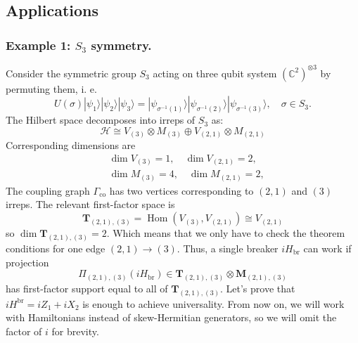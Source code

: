 \documentclass[10pt,twocolumn,superscriptaddress,aps,amsmath,amssymb,citeautoscript,floatfix,prx]{revtex4-2}
\theoremstyle{plain}
\theoremstyle{plain}
\theoremstyle{plain}
\theoremstyle{plain}
\theoremstyle{plain}
\theoremstyle{plain}
\newcommand{\HH}{\mathcal{H}}
\theoremstyle{plain}
\theoremstyle{definition}
\theoremstyle{plain}
\begin{document}
\begin{appendix}
\subsection{Applications}\label{sec:H_br_applications}
\label{sec:applications}

\subsubsection*{Example 1: $S_3$ symmetry.}

Consider the symmetric group $S_3$ acting on three qubit system $(\mathbb{C}^2)^{\otimes 3}$ by permuting them, i. e.
\[
U(\sigma)|\psi_1\rangle|\psi_2\rangle|\psi_3\rangle=|\psi_{\sigma^{-1}(1)}\rangle|\psi_{\sigma^{-1}(2)}\rangle|\psi_{\sigma^{-1}(3)}\rangle, \quad \sigma \in S_3.
\]
The Hilbert space decomposes into irreps of $S_3$ as:
\[
    \HH \cong V_{(3)} \otimes M_{(3)} \oplus V_{(2,1)} \otimes M_{(2,1)}
\]
Corresponding dimensions are
\[
    \begin{aligned}
    & \operatorname{dim} V_{(3)}=1, \quad \operatorname{dim} V_{(2,1)}=2, \\
    & \operatorname{dim} M_{(3)}=4, \quad \operatorname{dim} M_{(2,1)}=2,
    \end{aligned}
\]
The coupling graph $\Gamma_{\mathrm{co}}$ has two vertices corresponding to $(2,1)$ and $(3)$ irreps.
The relevant first-factor space is
\[
    \mathbf{T}_{(2,1),(3)}=\operatorname{Hom}\left(V_{(3)}, V_{(2,1)}\right) \cong V_{(2,1)}
\]
so $\operatorname{dim} \mathbf{T}_{(2,1),(3)}=2$. Which means that we only have to check the theorem conditions 
for one edge $(2,1)\to(3)$. Thus, a single breaker $iH_{\mathrm{br}}$ can work if projection
\[
    \Pi_{(2,1),(3)}\left(iH_{\mathrm{br}}\right) \in \mathbf{T}_{(2,1),(3)} \otimes \mathbf{M}_{(2,1),(3)}
\]
has first-factor support equal to all of $\mathbf{T}_{(2,1),(3)}$.
Let's prove that $iH^{\mathrm{br}}=iZ_1+iX_2$ is enough to achieve universality. From now on, we will work with Hamiltonians instead of skew-Hermitian generators, 
so we will omit the factor of $i$ for brevity. 


\end{appendix}
\end{document}
